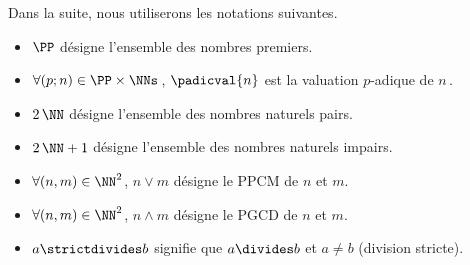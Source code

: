 Dans la suite, nous utiliserons les notations suivantes.
\begin{itemize}
	\item $\PP$ désigne l'ensemble des nombres premiers.
	
	
	\item $\forall (p ; n) \in \PP \times \NNs$\,, $\padicval{n}$ est la valuation $p$-adique de $n$\,.

	\item $2\,\NN$ désigne l'ensemble des nombres naturels pairs.
	
	\item $2\,\NN + 1$ désigne l'ensemble des nombres naturels impairs.
	
	\item $\forall (n , m) \in \NN^2$, $n \vee m$ désigne le PPCM de $n$ et $m$.

	\item $\forall (n , m) \in \NN^2$, $n \wedge m$ désigne le PGCD de $n$ et $m$.

	\item $a \strictdivides b$ signifie que $a \divides b$ et $a \neq b$ (division stricte).
\end{itemize}